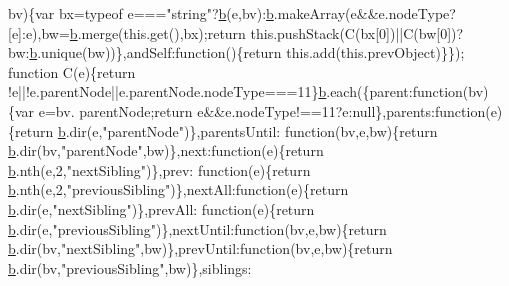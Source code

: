 \begin{DoxyCode}
      bv)\{var bx=typeof e===\textcolor{stringliteral}{"string"}?\hyperlink{docs_2_programmer's_manual_2html_2jquery_8js_aa4026ad5544b958e54ce5e106fa1c805}{b}(e,bv):\hyperlink{docs_2_programmer's_manual_2html_2jquery_8js_aa4026ad5544b958e54ce5e106fa1c805}{b}.makeArray(e&&e.nodeType?[e]:e),bw=\hyperlink{docs_2_programmer's_manual_2html_2jquery_8js_aa4026ad5544b958e54ce5e106fa1c805}{b}.merge(this.get(),bx);\textcolor{keywordflow}{return} 
      this.pushStack(C(bx[0])||C(bw[0])?bw:\hyperlink{docs_2_programmer's_manual_2html_2jquery_8js_aa4026ad5544b958e54ce5e106fa1c805}{b}.unique(bw))\},andSelf:\textcolor{keyword}{function}()\{\textcolor{keywordflow}{return} this.add(this.prevObject)\}\});\textcolor{keyword}{
      function} C(e)\{\textcolor{keywordflow}{return} !e||!e.parentNode||e.parentNode.nodeType===11\}\hyperlink{docs_2_programmer's_manual_2html_2jquery_8js_aa4026ad5544b958e54ce5e106fa1c805}{b}.each(\{parent:\textcolor{keyword}{function}(bv)\{var e=bv.
      parentNode;\textcolor{keywordflow}{return} e&&e.nodeType!==11?e:null\},parents:\textcolor{keyword}{function}(e)\{\textcolor{keywordflow}{return} \hyperlink{docs_2_programmer's_manual_2html_2jquery_8js_aa4026ad5544b958e54ce5e106fa1c805}{b}.dir(e,\textcolor{stringliteral}{"parentNode"})\},parentsUntil:\textcolor{keyword}{
      function}(bv,e,bw)\{\textcolor{keywordflow}{return} \hyperlink{docs_2_programmer's_manual_2html_2jquery_8js_aa4026ad5544b958e54ce5e106fa1c805}{b}.dir(bv,\textcolor{stringliteral}{"parentNode"},bw)\},next:\textcolor{keyword}{function}(e)\{\textcolor{keywordflow}{return} \hyperlink{docs_2_programmer's_manual_2html_2jquery_8js_aa4026ad5544b958e54ce5e106fa1c805}{b}.nth(e,2,\textcolor{stringliteral}{"nextSibling"})\},prev:\textcolor{keyword}{
      function}(e)\{\textcolor{keywordflow}{return} \hyperlink{docs_2_programmer's_manual_2html_2jquery_8js_aa4026ad5544b958e54ce5e106fa1c805}{b}.nth(e,2,\textcolor{stringliteral}{"previousSibling"})\},nextAll:\textcolor{keyword}{function}(e)\{\textcolor{keywordflow}{return} \hyperlink{docs_2_programmer's_manual_2html_2jquery_8js_aa4026ad5544b958e54ce5e106fa1c805}{b}.dir(e,\textcolor{stringliteral}{"nextSibling"})\},prevAll:\textcolor{keyword}{
      function}(e)\{\textcolor{keywordflow}{return} \hyperlink{docs_2_programmer's_manual_2html_2jquery_8js_aa4026ad5544b958e54ce5e106fa1c805}{b}.dir(e,\textcolor{stringliteral}{"previousSibling"})\},nextUntil:\textcolor{keyword}{function}(bv,e,bw)\{\textcolor{keywordflow}{return} 
      \hyperlink{docs_2_programmer's_manual_2html_2jquery_8js_aa4026ad5544b958e54ce5e106fa1c805}{b}.dir(bv,\textcolor{stringliteral}{"nextSibling"},bw)\},prevUntil:\textcolor{keyword}{function}(bv,e,bw)\{\textcolor{keywordflow}{return} \hyperlink{docs_2_programmer's_manual_2html_2jquery_8js_aa4026ad5544b958e54ce5e106fa1c805}{b}.dir(bv,\textcolor{stringliteral}{"previousSibling"},bw)\},siblings:\textcolor{keyword}{
}
\end{DoxyCode}
